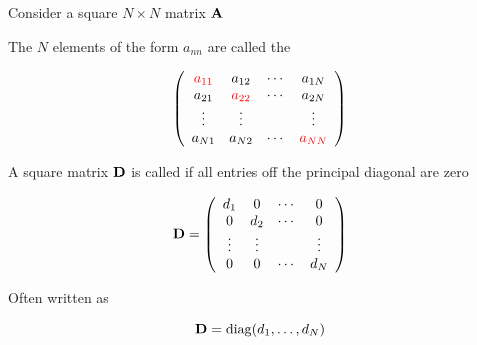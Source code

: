 \begin{frame}

    \vspace{2em}
    Consider a square $N \times N$ matrix $\mathbf A$

    \vspace{1em}

    The $N$ elements of the form $a_{nn}$ are called the 

    \vspace{1em}
    \begin{equation*}
        \left(
        \begin{array}{cccc}
            \textcolor{red}{a_{11}} & a_{12} & \cdots & a_{1N} \\
            a_{21} & \textcolor{red}{a_{22}} & \cdots & a_{2N} \\
            \vdots & \vdots &  & \vdots \\
            a_{N1} & a_{N2} & \cdots & \textcolor{red}{a_{NN}} \\
        \end{array}
        \right)
    \end{equation*}

\end{frame}


\begin{frame}
    
    \vspace{2em}
    A square matrix $\mathbf D$ is called  if all entries off the
    principal diagonal are zero

    \begin{equation*}
        \mathbf D = 
        \left(
        \begin{array}{cccc}
            d_1 & 0 & \cdots & 0 \\
            0 & d_2 & \cdots & 0 \\
            \vdots & \vdots &  & \vdots \\
            0 & 0 & \cdots & d_N \\
        \end{array}
        \right)
    \end{equation*}

    \vspace{1em}

    Often written as
    
    \begin{equation*}
        \mathbf D = \operatorname{diag}(d_1, \ldots, d_N) 
    \end{equation*}

\end{frame}



